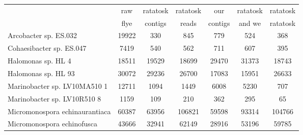\begin{minipage}{0.91\textwidth}
\begin{adjustbox}{center}
\begin{tabular}{|l||c|c|c|c|c|c|}
\hline
 & raw & ratatosk & ratatosk & our & ratatosk & ratatosk \\
 & flye & contigs & reads & contigs & and we & ratatosk \\
\hline
\hline
Arcobacter sp. ES.032 & \cellcolor[RGB]{235, 71, 71} 19922 & \cellcolor[RGB]{223, 223, 251} 330 & \cellcolor[RGB]{252, 232, 232} 845 & \cellcolor[RGB]{253, 241, 241} 779 & \cellcolor[RGB]{241, 241, 253} 524 & \cellcolor[RGB]{227, 227, 252} 368 \\
\hline
Cohaesibacter sp. ES.047 & \cellcolor[RGB]{235, 71, 71} 7419 & \cellcolor[RGB]{227, 227, 252} 540 & \cellcolor[RGB]{241, 241, 253} 562 & \cellcolor[RGB]{235, 71, 71} 711 & \cellcolor[RGB]{253, 237, 237} 607 & \cellcolor[RGB]{94, 94, 237} 395 \\
\hline
Halomonas sp. HL 4 & \cellcolor[RGB]{223, 223, 251} 18511 & \cellcolor[RGB]{252, 232, 232} 19529 & \cellcolor[RGB]{232, 232, 252} 18699 & \cellcolor[RGB]{235, 71, 71} 29470 & \cellcolor[RGB]{235, 71, 71} 31373 & \cellcolor[RGB]{232, 232, 252} 18743 \\
\hline
Halomonas sp. HL 93 & \cellcolor[RGB]{252, 232, 232} 30072 & \cellcolor[RGB]{253, 237, 237} 29236 & \cellcolor[RGB]{255, 255, 255} 26700 & \cellcolor[RGB]{218, 218, 251} 17083 & \cellcolor[RGB]{214, 214, 250} 15951 & \cellcolor[RGB]{255, 255, 255} 26633 \\
\hline
Marinobacter sp. LV10MA510 1 & \cellcolor[RGB]{235, 71, 71} 12711 & \cellcolor[RGB]{232, 232, 252} 1094 & \cellcolor[RGB]{237, 237, 253} 1449 & \cellcolor[RGB]{251, 223, 223} 6008 & \cellcolor[RGB]{252, 232, 232} 5230 & \cellcolor[RGB]{227, 227, 252} 707 \\
\hline
Marinobacter sp. LV10R510 8 & \cellcolor[RGB]{235, 71, 71} 1159 & \cellcolor[RGB]{223, 223, 251} 109 & \cellcolor[RGB]{246, 246, 254} 210 & \cellcolor[RGB]{251, 223, 223} 362 & \cellcolor[RGB]{253, 241, 241} 295 & \cellcolor[RGB]{214, 214, 250} 65 \\
\hline
Micromonospora echinaurantiaca & \cellcolor[RGB]{232, 232, 252} 60387 & \cellcolor[RGB]{237, 237, 253} 63956 & \cellcolor[RGB]{250, 214, 214} 106821 & \cellcolor[RGB]{227, 227, 252} 59598 & \cellcolor[RGB]{252, 232, 232} 93314 & \cellcolor[RGB]{251, 218, 218} 104766 \\
\hline
Micromonospora echinofusca & \cellcolor[RGB]{246, 246, 254} 43666 & \cellcolor[RGB]{223, 223, 251} 32941 & \cellcolor[RGB]{251, 218, 218} 62149 & \cellcolor[RGB]{214, 214, 250} 28916 & \cellcolor[RGB]{253, 241, 241} 53196 & \cellcolor[RGB]{252, 227, 227} 59785 \\

\end{tabular}
\end{adjustbox}
\end{minipage}
